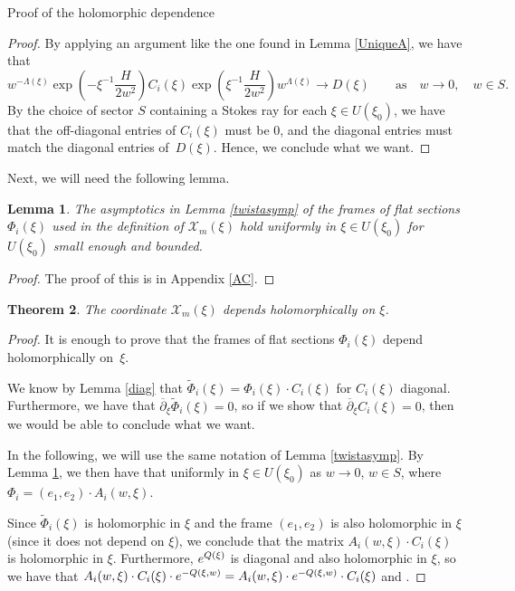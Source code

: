 \documentclass[11pt]{article}
\numberwithin{equation}{section}
\newtheorem{Theorem}{Theorem}[section]
\newtheorem{Lemma}[Theorem]{Lemma}
\numberwithin{equation}{section}
\newcommand{\MC}{\mathcal{X}_m}
\begin{document}
\begin{subsubsection}{Proof of the holomorphic dependence}
\begin{proof}
By applying an argument like the one found in Lemma \ref{UniqueA}, we have that
\begin{equation*}
 w^{-\Lambda(\xi)}\exp \left(-\xi^{-1}\frac{H}{2w^2}\right)C_i(\xi)\exp \left(\xi^{-1}\frac{H}{2w^2}\right)w^{\Lambda(\xi)} \to D(\xi) \qquad \text{as} \quad w\to 0,\quad w\in S.
\end{equation*}
By the choice of sector $S$ containing a Stokes ray for each $\xi \in U(\xi_0)$, we have that the off-diagonal entries of $C_i(\xi)$ must be $0$, and the diagonal entries must match the diagonal entries of~$D(\xi)$. Hence, we conclude what we want.
\end{proof}

Next, we will need the following lemma.

\begin{Lemma} \label{Lemma} The asymptotics in Lemma {\rm\ref{twistasymp}} of the frames of flat sections $\Phi_i(\xi)$ used in the definition of $\mathcal{X}_m(\xi)$ hold uniformly in $\xi \in U(\xi_0)$ for $U(\xi_0)$ small enough and bounded.
\end{Lemma}

\begin{proof}
The proof of this is in Appendix \ref{AC}.
\end{proof}

\begin{Theorem} The coordinate $\MC(\xi)$ depends holomorphically on $\xi$.
\end{Theorem}

\begin{proof}
It is enough to prove that the frames of flat sections $\Phi_i(\xi)$ depend holomorphically on~$\xi$.

We know by Lemma \ref{diag} that $\widetilde{\Phi}_i(\xi)=\Phi_i(\xi)\cdot C_i(\xi)$ for $C_i(\xi)$ diagonal. Furthermore, we have that $\overline{\partial}_{\xi}\widetilde{\Phi}_i(\xi)=0$, so if we show that $\overline{\partial}_{\xi}C_i(\xi)=0$, then we would be able to conclude what we want.

In the following, we will use the same notation of Lemma \ref{twistasymp}. By Lemma \ref{Lemma}, we then have that
 uniformly in $\xi \in U(\xi_0)$ as $ w\to 0$, $w\in S$,
where $\Phi_i=(e_1,e_2)\cdot A_i(w,\xi)$.

Since $\widetilde{\Phi}_i(\xi)$ is holomorphic in $\xi$ and the frame $(e_1,e_2)$ is also holomorphic in $\xi$ (since it does not depend on $\xi$), we conclude that the matrix $A_i(w,\xi)\cdot C_i(\xi)$ is holomorphic in $\xi$. Furthermore, ${\rm e}^{Q(\xi)}$ is diagonal and also holomorphic in $\xi$, so we have that $\smash{A_i(w,\xi)\cdot C_i(\xi)\cdot {\rm e}^{-Q(\xi,w)}}=\smash{A_i(w,\xi)\cdot {\rm e}^{-Q(\xi,w)}\cdot C_i(\xi)}$ and .


\end{proof}
\end{subsubsection}
\end{document}
